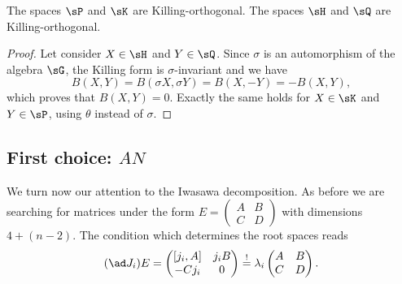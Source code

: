 \begin{proposition}
	The spaces $\sP$ and $\sK$ are Killing-orthogonal. The spaces $\sH$ and $\sQ$ are Killing-orthogonal.
\end{proposition}

\begin{proof}
	Let consider $X\in\sH$ and $Y\in\sQ$. Since $\sigma$ is an automorphism of the algebra $\sG$, the Killing form is $\sigma$-invariant and we have
	\begin{equation}
		B(X,Y)=B(\sigma X,\sigma Y)=B(X,-Y)=-B(X,Y),
	\end{equation}
	which proves that $B(X,Y)=0$. Exactly the same holds for $X\in\sK$ and $Y\in\sP$, using $\theta$ instead of $\sigma$.
\end{proof}

\subsection{First choice: \texorpdfstring{$AN$}{AN}}\label{subsecIwasawa_deux}

We turn now our attention to the Iwasawa decomposition. As before we are searching for matrices under the form $E=\begin{pmatrix}A&B\\C&D\end{pmatrix}$ with dimensions $4+(n-2)$. The condition which determines the root spaces reads
\begin{equation}
	(\ad J_i)E=
	\begin{pmatrix}
		[j_i,A] & j_iB \\
		-Cj_i   & 0
	\end{pmatrix}
	\stackrel{!}{=}\lambda_i
	\begin{pmatrix}A&B\\C&D\end{pmatrix}.
\end{equation}


